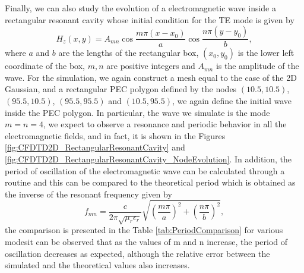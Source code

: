 \documentclass[12pt, oneside]{book}
\begin{document}
\newpage
Finally, we can also study the evolution of a electromagnetic wave inside a rectangular resonant cavity whose initial condition for the TE mode is given by \cite{pozar2012microwave}
\begin{equation}
    H_z(x, y) = A_{mn}\cos\dfrac{m \pi (x-x_0)}{a} \cos\dfrac{n \pi (y-y_0)}{b},
\label{eq:ResonantRectangularCavity}
\end{equation}
where $a$ and $b$ are the lengths of the rectangular box, $(x_0, y_0)$ is the lower left coordinate of the box, $m, n$ are positive integers and $A_{mn}$ is the amplitude of the wave. For the simulation, we again construct a mesh equal to the case of the 2D Gaussian, and a rectangular PEC polygon defined by the nodes $(10.5,10.5)$, $(95.5,10.5)$, $(95.5, 95.5)$ and $(10.5, 95.5)$, we again define the initial wave inside the PEC polygon. In particular, the wave we simulate is the mode $m = n = 4$, we expect to observe a resonance and periodic behavior in all the electromagnetic fields, and in fact, it is shown in the Figures \ref{fig:CFDTD2D_RectangularResonantCavity} and \ref{fig:CFDTD2D_RectangularResonantCavity_NodeEvolution}. In addition, the period of oscillation of the electromagnetic wave can be calculated through a routine and this can be compared to the theoretical period which is obtained as the inverse of the resonant frequency given by \cite{pozar2012microwave}
\begin{equation}
    f_{mn} = \dfrac{c}{2 \pi \sqrt{\mu_r \epsilon_r}} \sqrt{ \left( \dfrac{m\pi}{a} \right)^2 + \left( \dfrac{n\pi}{b} \right)^2},
\end{equation}
the comparison is presented in the Table \ref{tab:PeriodComparison} for various modesit can be observed that as the values of m and n increase, the period of oscillation decreases as expected, although the relative error between the simulated and the theoretical values also increases.
\end{document}
